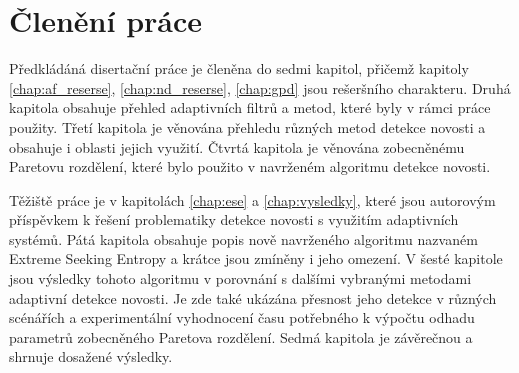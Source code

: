 \section{Členění práce}
Předkládáná disertační práce je členěna do sedmi kapitol, přičemž kapitoly \ref{chap:af_reserse}, \ref{chap:nd_reserse}, \ref{chap:gpd} jsou rešeršního charakteru. Druhá kapitola obsahuje přehled adaptivních filtrů a metod, které byly v rámci práce použity. Třetí kapitola je věnována přehledu různých metod detekce novosti a obsahuje i oblasti jejich využití.  Čtvrtá kapitola je věnována zobecněnému Paretovu rozdělení, které bylo použito v navrženém algoritmu detekce novosti.
\par  
Těžiště práce je v kapitolách \ref{chap:ese} a \ref{chap:vysledky}, které jsou autorovým příspěvkem k řešení problematiky detekce novosti s využitím adaptivních systémů.
Pátá kapitola obsahuje popis nově navrženého algoritmu nazvaném Extreme Seeking Entropy a krátce jsou zmíněny i jeho omezení. V šesté kapitole jsou výsledky tohoto algoritmu v porovnání s dalšími vybranými metodami adaptivní detekce novosti. Je zde také ukázána přesnost jeho detekce v různých scénářích a experimentální vyhodnocení času potřebného k výpočtu odhadu parametrů zobecněného Paretova rozdělení. Sedmá kapitola je závěrečnou a shrnuje dosažené výsledky.